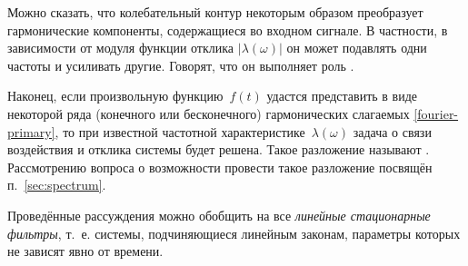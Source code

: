 
Можно сказать, что колебательный контур некоторым образом
преобразует гармонические компоненты, содержащиеся во входном сигнале.
В частности, в зависимости от модуля функции отклика $|\lambda(\omega)|$ 
он может подавлять одни частоты и усиливать другие.
Говорят, что он выполняет роль .

Наконец, если произвольную функцию~$f(t)$ удастся представить в виде
некоторой ряда (конечного или бесконечного) гармонических слагаемых
\eqref{fourier-primary}, то при известной частотной характеристике~$\lambda(\omega)$ 
задача о связи воздействия и отклика системы будет решена.
Такое разложение называют . Рассмотрению вопроса о возможности 
провести такое разложение посвящён п.~\ref{sec:spectrum}.


%


Проведённые рассуждения можно обобщить на все \emph{линейные стационарные
фильтры}, т.~е. системы, подчиняющиеся линейным законам, параметры которых 
не зависят явно от времени.

